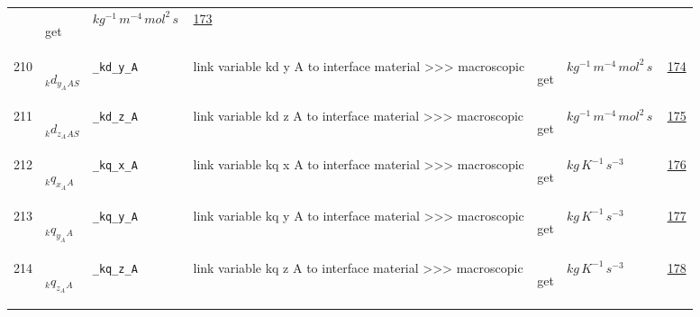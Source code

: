 \begin{longtable}{|p{1cm}|p{2.5cm}|p{4.5cm}|p{8cm}|p{3.0cm}|p{3cm}|p{1cm}|}
             & \begin{lay}get \end{lay}
             & $ kg^{-1} \,m^{-4} \,mol^{2} \,s \, $
             &                 \hyperlink{"e:173"}{ 173 }
                 \\
            210
             & \hypertarget{"v:210"}{ $ {_kd_y_A}{_{{A S}}} $}
             & \verb|_kd_y_A|
             & link variable kd y A to interface material >>> macroscopic
             & \begin{lay}get \end{lay}
             & $ kg^{-1} \,m^{-4} \,mol^{2} \,s \, $
             &                 \hyperlink{"e:174"}{ 174 }
                 \\
            211
             & \hypertarget{"v:211"}{ $ {_kd_z_A}{_{{A S}}} $}
             & \verb|_kd_z_A|
             & link variable kd z A to interface material >>> macroscopic
             & \begin{lay}get \end{lay}
             & $ kg^{-1} \,m^{-4} \,mol^{2} \,s \, $
             &                 \hyperlink{"e:175"}{ 175 }
                 \\
            212
             & \hypertarget{"v:212"}{ $ {_kq_x_A}{_{A}} $}
             & \verb|_kq_x_A|
             & link variable kq x A to interface material >>> macroscopic
             & \begin{lay}get \end{lay}
             & $ kg \,K^{-1} \,s^{-3} \, $
             &                 \hyperlink{"e:176"}{ 176 }
                 \\
            213
             & \hypertarget{"v:213"}{ $ {_kq_y_A}{_{A}} $}
             & \verb|_kq_y_A|
             & link variable kq y A to interface material >>> macroscopic
             & \begin{lay}get \end{lay}
             & $ kg \,K^{-1} \,s^{-3} \, $
             &                 \hyperlink{"e:177"}{ 177 }
                 \\
            214
             & \hypertarget{"v:214"}{ $ {_kq_z_A}{_{A}} $}
             & \verb|_kq_z_A|
             & link variable kq z A to interface material >>> macroscopic
             & \begin{lay}get \end{lay}
             & $ kg \,K^{-1} \,s^{-3} \, $
             &                 \hyperlink{"e:178"}{ 178 }
                 \\

\end{longtable}
